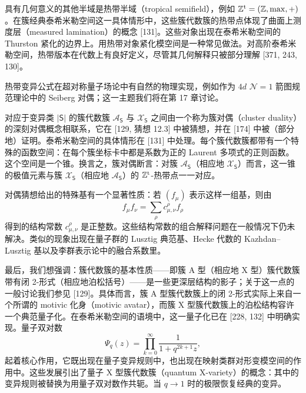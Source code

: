 具有几何意义的其他半域是热带半域（tropical semifield），例如 $\mathbb{Z}^{\mathrm{t}}=(\mathbb{Z},\max,+)$。在簇经典泰希米勒空间这一具体情形中，这些簇代数簇的热带点体现了曲面上测度层（measured lamination）的概念 [131]。这些对象出现在泰希米勒空间的 Thurston 紧化的边界上。用热带对象紧化模空间是一种常见做法。对高阶泰希米勒空间，热带版本在代数上有良好定义，尽管其几何解释只被部分理解 [371, 243, 130]。

\begin{remark}[5.15]
热带变异公式在超对称量子场论中有自然的物理实现，例如作为 $4d$ $\mathcal{N}=1$ 箭图规范理论中的 Seiberg 对偶；这一主题我们将在第 17 章讨论。
\end{remark}

对应于变异类 $|\mathsf{S}|$ 的簇代数簇 $\mathcal{A}_{\mathsf{S}}$ 与 $\mathcal{X}_{\mathsf{S}}$ 之间由一个称为簇对偶（cluster duality）的深刻对偶概念相联系，它在 [129, 猜想 12.3] 中被猜想，并在 [174] 中被（部分地）证明。泰希米勒空间的具体情形在 [131] 中处理。每个簇代数簇都带有一个特殊的函数空间：在每个簇坐标卡中都是系数为正的 Laurent 多项式的正则函数。这个空间是一个锥。换言之，簇对偶断言：对簇 $\mathcal{A}_{\mathsf{S}}$（相应地 $\mathcal{X}_{\mathsf{S}}$）而言，这一锥的极值元素与簇 $\mathcal{X}_{\mathsf{S}}$（相应地 $\mathcal{A}_{\mathsf{S}}$）的 $\mathbb{Z}^{\mathrm{t}}$-热带点一一对应。

对偶猜想给出的特殊基有一个显著性质：若 $(f_\mu)$ 表示这样一组基，则由
\[
f_\mu f_\nu=\sum_\rho c^\rho_{\mu,\nu}f_\rho
\]
得到的结构常数 $c^\rho_{\mu,\nu}$ 是正整数。这些结构常数的组合解释问题在一般情况下仍未解决。类似的现象出现在量子群的 Lusztig 典范基、Hecke 代数的 Kazhdan–Lusztig 基以及李群表示论中的融合系数里。

最后，我们想强调：簇代数簇的基本性质——即簇 A 型（相应地 X 型）簇代数簇带有闭 2-形式（相应地泊松括号）——是一些更深层结构的影子；关于这一点的一般讨论我们参见 [129]。具体而言，簇 A 型簇代数簇上的闭 2-形式实际上来自一个所谓的 motivic 化身（motivic avatar），而簇 X 型簇代数簇上的泊松结构容许一个典范量子化。在泰希米勒空间的语境中，这一量子化已在 [228, 132] 中明确实现。量子双对数
\[
\Psi_q(z)=\prod_{k=0}^{\infty}\frac{1}{1+q^{2k+1}z},
\]
起着核心作用，它既出现在量子变异规则中，也出现在映射类群对形变模空间的作用中。这些发展引出了量子 X 型簇代数簇（quantum X-variety）的概念：其中的变异规则被替换为用量子双对数作共轭。当 $q\to1$ 时的极限恢复经典的变异。

